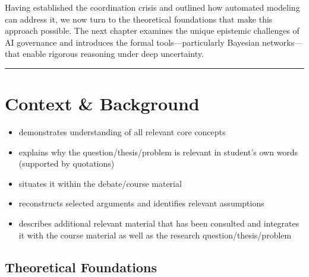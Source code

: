 \documentclass[
  11pt,
  letterpaper,
]{book}
\providecommand{\tightlist}{%
  \setlength{\itemsep}{0pt}\setlength{\parskip}{0pt}}
\begin{document}
Having established the coordination crisis and outlined how automated
modeling can address it, we now turn to the theoretical foundations that
make this approach possible. The next chapter examines the unique
epistemic challenges of AI governance and introduces the formal
tools---particularly Bayesian networks---that enable rigorous reasoning
under deep uncertainty.

\begin{center}\rule{0.5\linewidth}{0.5pt}\end{center}


\chapter{Context \& Background}\label{sec-context}

\begin{tcolorbox}[enhanced jigsaw, bottomrule=.15mm, title=\textcolor{quarto-callout-note-color}{\faInfo}\hspace{0.5em}{20\% of Grade: \textasciitilde{} 29\% of text \textasciitilde{} 8700
words \textasciitilde{} 20 pages}, opacityback=0, arc=.35mm, breakable, toptitle=1mm, toprule=.15mm, colframe=quarto-callout-note-color-frame, bottomtitle=1mm, rightrule=.15mm, opacitybacktitle=0.6, left=2mm, titlerule=0mm, leftrule=.75mm, colback=white, colbacktitle=quarto-callout-note-color!10!white, coltitle=black]

\begin{itemize}
\tightlist
\item
  demonstrates understanding of all relevant core concepts
\item
  explains why the question/thesis/problem is relevant in student's own
  words (supported by quotations)
\item
  situates it within the debate/course material
\item
  reconstructs selected arguments and identifies relevant assumptions
\item
  describes additional relevant material that has been consulted and
  integrates it with the course material as well as the research
  question/thesis/problem
\end{itemize}

\end{tcolorbox}

\section{Theoretical Foundations}\label{sec-theoretical-foundations}
\end{document}
